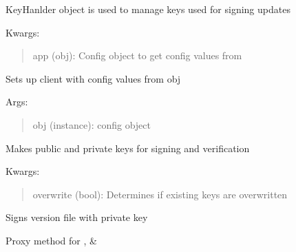 \documentclass[letterpaper,10pt,english]{sphinxmanual}
\begin{document}
\label{api:module-pyi_updater.key_handler}

\begin{fulllineitems}
\label{api:pyi_updater.key_handler.KeyHandler}
KeyHanlder object is used to manage keys used for signing updates

Kwargs:
\begin{quote}

app (obj): Config object to get config values from
\end{quote}

\begin{fulllineitems}
\label{api:pyi_updater.key_handler.KeyHandler.init_app}
Sets up client with config values from obj

Args:
\begin{quote}

obj (instance): config object
\end{quote}

\end{fulllineitems}


\begin{fulllineitems}
\label{api:pyi_updater.key_handler.KeyHandler.make_keys}
Makes public and private keys for signing and verification

Kwargs:
\begin{quote}

overwrite (bool): Determines if existing keys are overwritten
\end{quote}

\end{fulllineitems}


\begin{fulllineitems}
\label{api:pyi_updater.key_handler.KeyHandler.sign_update}
Signs version file with private key

Proxy method for ,  \&


\end{fulllineitems}
\end{fulllineitems}
\end{document}
